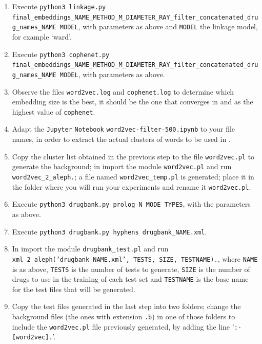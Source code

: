 \documentclass[12pt, openany]{book}
\begin{document}
\begin{appendices}
\begin{enumerate}
	\item Execute \texttt{python3 linkage.py final\_embeddings\_NAME\_METHOD\_M\_DIAMETER\_RAY\_}\linebreak\texttt{filter\_concatenated\_drug\_names\_NAME MODEL}, with parameters as above and \texttt{MODEL} the linkage model, for example `ward'.

	\item Execute \texttt{python3 cophenet.py final\_embeddings\_NAME\_METHOD\_M\_DIAMETER\_RAY\_}\linebreak\texttt{filter\_concatenated\_drug\_names\_NAME MODEL}, with parameters as above.

	\item Observe the files \texttt{word2vec.log} and \texttt{cophenet.log} to determine which embedding size is the best, it should be the one that converges in \wordvec and as the highest value of \texttt{cophenet}.

	\item Adapt the \texttt{Jupyter} \texttt{Notebook}  \texttt{word2vec-filter-500.ipynb} to your file names, in order to extract the actual clusters of words to be used in \alephilp.

	\item Copy the cluster list obtained in the previous step to the file \texttt{word2vec.pl} to generate the \wordvec \alephilp background; in \swi import the module \texttt{word2vec.pl} and run \texttt{word2vec\_2\_aleph.}; a file named \texttt{word2vec\_temp.pl} is generated; place it in the folder where you will run your experiments and rename it \texttt{word2vec.pl}.

	\item Execute \texttt{python3 drugbank.py prolog N MODE TYPES}, with the parameters as above.

	\item Execute \texttt{python3 drugbank.py hyphens drugbank\_NAME.xml}.

	\item In \swi import the module \texttt{drugbank\_test.pl} and run \linebreak 
	\texttt{xml\_2\_aleph('drugbank\_NAME.xml', TESTS, SIZE, TESTNAME).}, where \texttt{NAME} is as above, \texttt{TESTS} is the number of tests to generate, \texttt{SIZE} is the number of drugs to use in the training of each test set and \texttt{TESTNAME} is the base name for the test \alephilp files that will be generated.

	\item Copy the test files generated in the last step into two folders; change the background files (the ones with extension \texttt{.b}) in one of those folders to include the \texttt{word2vec.pl} file previously generated, by adding the line '\texttt{:- [word2vec].}'.


\end{enumerate}
\end{appendices}
\end{document}
